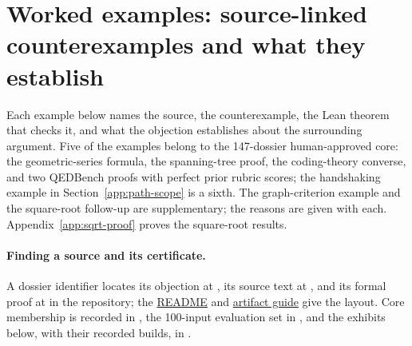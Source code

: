 \section{Worked examples: source-linked counterexamples and what they establish}
\label{app:auditing-exhibits}
Each example below names the source, the counterexample, the Lean theorem that checks it, and what the objection establishes about the surrounding argument. Five of the examples belong to the 147-dossier human-approved core: the geometric-series formula, the spanning-tree proof, the coding-theory converse, and two QEDBench proofs with perfect prior rubric scores; the handshaking example in Section~\ref{app:path-scope} is a sixth. The graph-criterion example and the square-root follow-up are supplementary; the reasons are given with each. Appendix~\ref{app:sqrt-proof} proves the square-root results.

\paragraph{Finding a source and its certificate.}
A dossier identifier locates its objection at , its source text at , and its formal proof at  in the repository; the \href{https://github.com/qqliu/CoPEER/blob/main/README.md}{README} and \href{https://github.com/qqliu/CoPEER/blob/main/ARTIFACTS.md}{artifact guide} give the layout. Core membership is recorded in , the 100-input evaluation set in , and the exhibits below, with their recorded builds, in .

